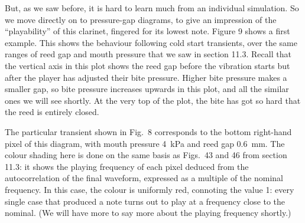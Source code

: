   But, as we saw before, it is hard to learn much from an individual 
  simulation. So we move directly on to pressure-gap diagrams, to give an 
  impression of the “playability” of this clarinet, fingered for its lowest 
  note. Figure 9 shows a first example. This shows the behaviour following cold 
  start transients, over the same ranges of reed gap and mouth pressure that we 
  saw in section 11.3. Recall that the vertical axis in this plot shows the 
  reed gap before the vibration starts but after the player has adjusted their 
  bite pressure. Higher bite pressure makes a smaller gap, so bite pressure 
  increases upwards in this plot, and all the similar ones we will see shortly. 
  At the very top of the plot, the bite has got so hard that the reed is 
  entirely closed. 


  The particular transient shown in Fig.\ 8 corresponds to the bottom 
  right-hand pixel of this diagram, with mouth pressure 4~kPa and reed gap 
  0.6~mm. The colour shading here is done on the same basis as Figs.\ 43 and 46 
  from section 11.3: it shows the playing frequency of each pixel deduced from 
  the autocorrelation of the final waveform, expressed as a multiple of the 
  nominal frequency. In this case, the colour is uniformly red, connoting the 
  value 1: every single case that produced a note turns out to play at a 
  frequency close to the nominal. (We will have more to say more about the 
  playing frequency shortly.) 

